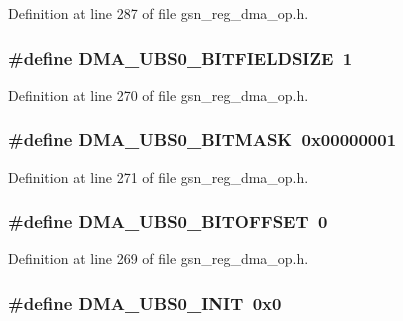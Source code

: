 Definition at line 287 of file gsn\_\-reg\_\-dma\_\-op.h.

\hypertarget{a00547_a8042a05749b9a48b9d1297b6f18421b0}{
\subsubsection[{DMA\_\-UBS0\_\-BITFIELDSIZE}]{\setlength{\rightskip}{0pt plus 5cm}\#define DMA\_\-UBS0\_\-BITFIELDSIZE~1}}
\label{a00547_a8042a05749b9a48b9d1297b6f18421b0}


Definition at line 270 of file gsn\_\-reg\_\-dma\_\-op.h.

\hypertarget{a00547_ae8bde4517976f8b9a435695635769a2b}{
\subsubsection[{DMA\_\-UBS0\_\-BITMASK}]{\setlength{\rightskip}{0pt plus 5cm}\#define DMA\_\-UBS0\_\-BITMASK~0x00000001}}
\label{a00547_ae8bde4517976f8b9a435695635769a2b}


Definition at line 271 of file gsn\_\-reg\_\-dma\_\-op.h.

\hypertarget{a00547_ad1f484910de0d7511f11eae9c6ea26b1}{
\subsubsection[{DMA\_\-UBS0\_\-BITOFFSET}]{\setlength{\rightskip}{0pt plus 5cm}\#define DMA\_\-UBS0\_\-BITOFFSET~0}}
\label{a00547_ad1f484910de0d7511f11eae9c6ea26b1}


Definition at line 269 of file gsn\_\-reg\_\-dma\_\-op.h.

\hypertarget{a00547_ab4b7b4598f9c3fec92c514fae4e89c02}{
\subsubsection[{DMA\_\-UBS0\_\-INIT}]{\setlength{\rightskip}{0pt plus 5cm}\#define DMA\_\-UBS0\_\-INIT~0x0}}
\label{a00547_ab4b7b4598f9c3fec92c514fae4e89c02}


